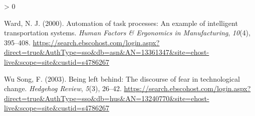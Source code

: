 \documentclass[
  english,
  man]{apa7}
\newlength{\cslhangindent}
\newenvironment{CSLReferences}[2] %
 {%
  \setlength{\parindent}{0pt}
  \ifodd #1 \everypar{\setlength{\hangindent}{\cslhangindent}}\ignorespaces\fi
  \ifnum #2 > 0
  \setlength{\parskip}{#2\baselineskip}
  \fi
 }%
 {}
\begin{document}
\begin{CSLReferences}{1}{0}
\leavevmode\hypertarget{ref-1336134720000101}{}%
Ward, N. J. (2000). Automation of task processes: An example of intelligent transportation systems. \emph{Human Factors \& Ergonomics in Manufacturing}, \emph{10}(4), 395--408. \url{https://search.ebscohost.com/login.aspx?direct=true\&AuthType=sso\&db=asn\&AN=13361347\&site=ehost-live\&scope=site\&custid=s4786267}

\leavevmode\hypertarget{ref-1324077020030101}{}%
Wu Song, F. (2003). Being left behind: The discourse of fear in technological change. \emph{Hedgehog Review}, \emph{5}(3), 26--42. \url{https://search.ebscohost.com/login.aspx?direct=true\&AuthType=sso\&db=hus\&AN=13240770\&site=ehost-live\&scope=site\&custid=s4786267}

\end{CSLReferences}

\endgroup
\end{document}
